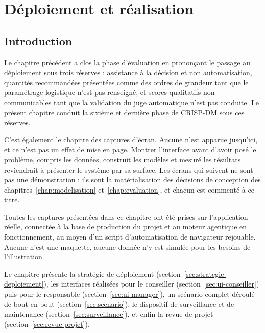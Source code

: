 %

\chapter{Déploiement et réalisation}
\label{chap:deploiement}

\section*{Introduction}

Le chapitre précédent a clos la phase d'évaluation en prononçant le passage au déploiement sous trois réserves : assistance à la décision et non automatisation, quantités recommandées présentées comme des ordres de grandeur tant que le paramétrage logistique n'est pas renseigné, et scores qualitatifs non communicables tant que la validation du juge automatique n'est pas conduite. Le présent chapitre conduit la sixième et dernière phase de CRISP-DM sous ces réserves.

C'est également le chapitre des captures d'écran. Aucune n'est apparue jusqu'ici, et ce n'est pas un effet de mise en page. Montrer l'interface avant d'avoir posé le problème, compris les données, construit les modèles et mesuré les résultats reviendrait à présenter le système par sa surface. Les écrans qui suivent ne sont pas une démonstration : ils sont la matérialisation des décisions de conception des chapitres~\ref{chap:modelisation} et~\ref{chap:evaluation}, et chacun est commenté à ce titre.

Toutes les captures présentées dans ce chapitre ont été prises sur l'application réelle, connectée à la base de production du projet et au moteur agentique en fonctionnement, au moyen d'un script d'automatisation de navigateur rejouable. Aucune n'est une maquette, aucune donnée n'y est simulée pour les besoins de l'illustration.

Le chapitre présente la stratégie de déploiement (section~\ref{sec:strategie-deploiement}), les interfaces réalisées pour le conseiller (section~\ref{sec:ui-conseiller}) puis pour le responsable (section~\ref{sec:ui-manager}), un scénario complet déroulé de bout en bout (section~\ref{sec:scenario}), le dispositif de surveillance et de maintenance (section~\ref{sec:surveillance}), et enfin la revue de projet (section~\ref{sec:revue-projet}).

